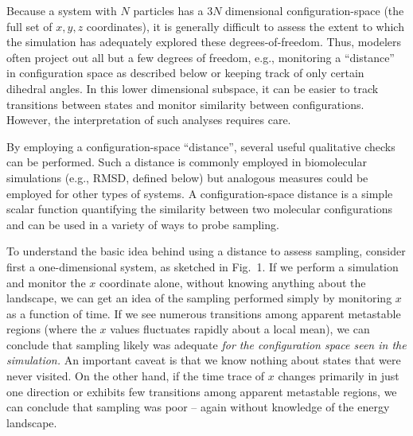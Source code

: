Because a system with $N$ particles has a $3N$ dimensional configuration-space (the full set of $x, y, z$ coordinates), it is generally difficult to assess the extent to which the simulation has adequately explored these degrees-of-freedom.  Thus, modelers often project out all but a few degrees of freedom, e.g., monitoring a ``distance'' in configuration space as described below or keeping track of only certain dihedral angles.  In this lower dimensional subspace, it can be easier to track transitions between states and monitor similarity between configurations.  However, the interpretation of such analyses requires care.

By employing a configuration-space ``distance'', several useful qualitative checks can be performed.
Such a distance is commonly employed in biomolecular simulations (e.g., RMSD, defined below) but analogous measures could be employed for other types of systems.
A configuration-space distance is a simple scalar function quantifying the similarity between two molecular configurations and can be used in a variety of ways to probe sampling.    

To understand the basic idea behind using a distance to assess sampling, consider first a one-dimensional system, as sketched in Fig.\ 1.  If we perform a simulation and monitor the $x$ coordinate alone, without knowing anything about the landscape, we can get an idea of the sampling performed simply by monitoring $x$ as a function of time.  If we see numerous transitions among apparent metastable regions (where the $x$ values fluctuates rapidly about a local mean), we can conclude that sampling likely was adequate \emph{for the configuration space seen in the simulation.}  An important caveat is that we know nothing about states that were never visited.  On the other hand, if the time trace of $x$ changes primarily in just one direction or exhibits few transitions among apparent metastable regions, we can conclude that sampling was poor -- again without knowledge of the energy landscape.

